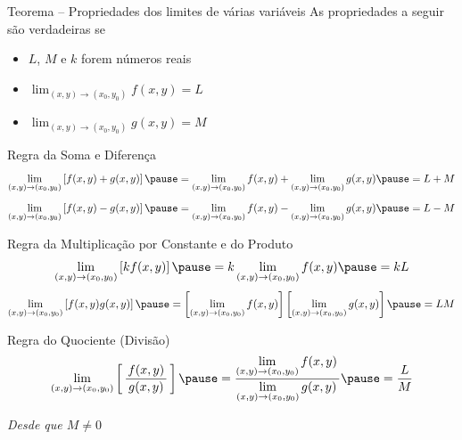 \begin{frame}{Teorema -- Propriedades dos limites de várias variáveis}
  As propriedades a seguir são verdadeiras se
  \begin{itemize}[<+->]
    \setlength\itemsep{1.5em}
    \item $L$, $M$ e $k$ forem números reais
    \item \(\lim_{(x, y)\to(x_0, y_0)} f(x, y) = L\)
    \item \(\lim_{(x, y)\to(x_0, y_0)} g(x, y) = M\)
  \end{itemize}
\end{frame}

\begin{frame}{Regra da Soma e Diferença}
  \[
    \lim_{(x, y)\to(x_0, y_0)} \left[f(x, y) + g(x, y)\right]
    \pause =
    \lim_{(x, y)\to(x_0, y_0)} f(x, y) + \lim_{(x, y)\to(x_0, y_0)} g(x, y)
    \pause =
    L + M
  \]
  \pause
  \vspace{\baselineskip}
  \[
    \lim_{(x, y)\to(x_0, y_0)} \left[f(x, y) - g(x, y)\right]
    \pause =
    \lim_{(x, y)\to(x_0, y_0)} f(x, y) - \lim_{(x, y)\to(x_0, y_0)} g(x, y)
    \pause =
    L - M
  \]
\end{frame}

\begin{frame}{Regra da Multiplicação por Constante e do Produto}
  \[
    \lim_{(x, y)\to(x_0, y_0)} \left[k f(x, y)\right]
    \pause =
    k \lim_{(x, y)\to(x_0, y_0)} f(x, y)
    \pause =
    k L
  \]
  \pause
  \vspace{\baselineskip}
  \[
    \lim_{(x, y)\to(x_0, y_0)} \left[f(x, y) g(x, y)\right]
    \pause =
    \left[\lim_{(x, y)\to(x_0, y_0)} f(x, y) \right]
    \left[\lim_{(x, y)\to(x_0, y_0)} g(x, y) \right]
    \pause =
    LM
  \]
\end{frame}

\begin{frame}{Regra do Quociente (Divisão)}
  \[
    \lim_{(x, y)\to(x_0, y_0)} \left[ \,\frac{\,f(x, y)\,}{g(x, y)} \, \right]
    \pause =
    \dfrac{\displaystyle\lim_{(x, y)\to(x_0, y_0)} f(x, y)\,}
          {\displaystyle\lim_{(x, y)\to(x_0, y_0)} g(x, y)\,}
    \pause =
    \frac{L}{M}
  \]

  \pause
  \emph{Desde que \(M\neq 0\)}
\end{frame}

